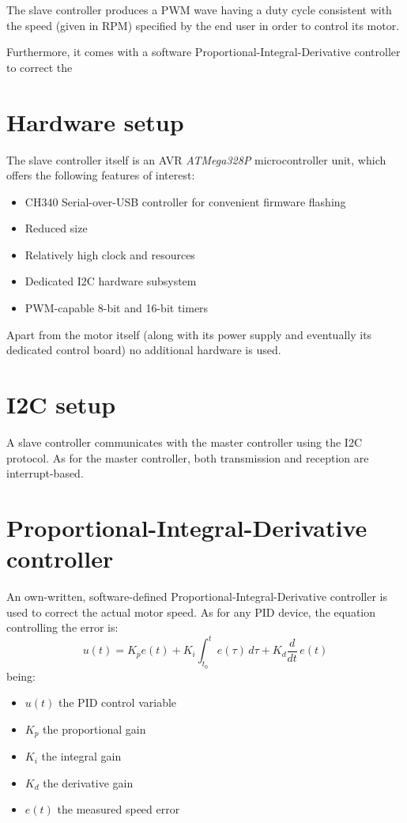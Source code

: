 \documentclass[binding=0.6cm,Lau]{sapthesis}
\begin{document}
The slave controller produces a PWM wave having a duty cycle consistent with
the speed (given in RPM) specified by the end user in order to control its
motor.

Furthermore, it comes with a software Proportional-Integral-Derivative
controller to correct the 

\section{Hardware setup}
The slave controller itself is an AVR \emph{ATMega328P} microcontroller
unit\cite{at328p-ref}, which offers the following features of interest:

\begin{itemize}
  \item CH340 Serial-over-USB controller for convenient firmware flashing
  \item Reduced size
  \item Relatively high clock and resources
  \item Dedicated I2C hardware subsystem
  \item PWM-capable 8-bit and 16-bit timers
\end{itemize}

Apart from the motor itself (along with its power supply and eventually its
dedicated control board) no additional hardware is used.

\section{I2C setup}
A slave controller communicates with the master controller using the I2C
protocol. As for the master controller, both transmission and reception are
interrupt-based.

\section{Proportional-Integral-Derivative controller}
An own-written, software-defined Proportional-Integral-Derivative controller is
used to correct the actual motor speed. As for any PID device, the equation
controlling the error is:
\begin{equation}
  u(t) = K_p e(t) + K_i \int_{t_0}^t e(\tau)\,d\tau + K_d \frac{d}{dt}\,e(t)
\end{equation}
being:
\begin{itemize}
  \item $u(t)$ the PID control variable
  \item $K_p$ the proportional gain
  \item $K_i$ the integral gain
  \item $K_d$ the derivative gain
  \item $e(t)$ the measured speed error
\end{itemize}
\end{document}
